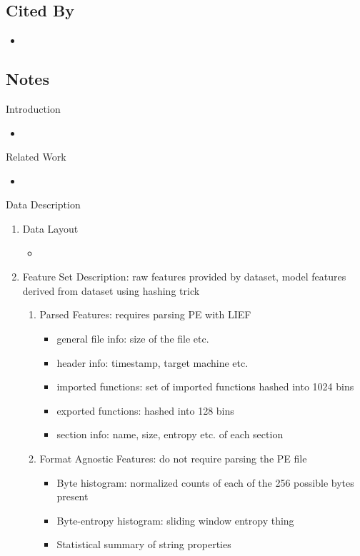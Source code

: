 \documentclass{article}
\begin{document}
\subsection*{Cited By}
\begin{itemize}
\item
\end{itemize}

\subsection*{Notes}

Introduction
\begin{itemize}
\item
\end{itemize}
Related Work
\begin{itemize}
\item
\end{itemize}
Data Description
\begin{enumerate}
	\item Data Layout
	\begin{itemize}
		\item 
	\end{itemize}
	\item Feature Set Description: raw features provided by dataset, model features derived from dataset using hashing trick
	\begin{enumerate}
		\item Parsed Features: requires parsing PE with LIEF
		\begin{itemize}
			\item general file info: size of the file etc.
			\item header info: timestamp, target machine etc.
			\item imported functions: set of imported functions hashed into 1024 bins
			\item exported functions: hashed into 128 bins
			\item section info: name, size, entropy etc. of each section
		\end{itemize}
		\item Format Agnostic Features: do not require parsing the PE file
		\begin{itemize}
			\item Byte histogram: normalized counts of each of the 256 possible bytes present
			\item Byte-entropy histogram: sliding window entropy thing
			\item Statistical summary of string properties
		\end{itemize}
	\end{enumerate}
\end{enumerate}
\end{document}
